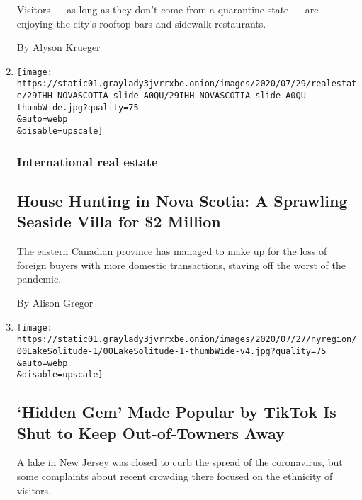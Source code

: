 \begin{enumerate}
  Visitors --- as long as they don't come from a quarantine state ---
  are enjoying the city's rooftop bars and sidewalk restaurants.

  By Alyson Krueger
\item
  \href{/2020/07/29/realestate/house-hunting-in-nova-scotia-a-sprawling-seaside-villa-for-2-million.html}{}

  \texttt{[image: https://static01.graylady3jvrrxbe.onion/images/2020/07/29/realestate/29IHH-NOVASCOTIA-slide-A0QU/29IHH-NOVASCOTIA-slide-A0QU-thumbWide.jpg?quality=75\\\&auto=webp\\\&disable=upscale]}

  \hypertarget{international-real-estate}{%
  \subsubsection{International real
  estate}\label{international-real-estate}}

  \hypertarget{house-hunting-in-nova-scotia-a-sprawling-seaside-villa-for-2-million}{%
  \subsection{House Hunting in Nova Scotia: A Sprawling Seaside Villa
  for \$2
  Million}\label{house-hunting-in-nova-scotia-a-sprawling-seaside-villa-for-2-million}}

  The eastern Canadian province has managed to make up for the loss of
  foreign buyers with more domestic transactions, staving off the worst
  of the pandemic.

  By Alison Gregor
\item
  \href{/2020/07/29/nyregion/lake-solitude-closed-racism.html}{}

  \texttt{[image: https://static01.graylady3jvrrxbe.onion/images/2020/07/27/nyregion/00LakeSolitude-1/00LakeSolitude-1-thumbWide-v4.jpg?quality=75\\\&auto=webp\\\&disable=upscale]}

  \hypertarget{hidden-gem-made-popular-by-tiktok-is-shut-to-keep-out-of-towners-away}{%
  \subsection{`Hidden Gem' Made Popular by TikTok Is Shut to Keep
  Out-of-Towners
  Away}\label{hidden-gem-made-popular-by-tiktok-is-shut-to-keep-out-of-towners-away}}

  A lake in New Jersey was closed to curb the spread of the coronavirus,
  but some complaints about recent crowding there focused on the
  ethnicity of visitors.


\end{enumerate}
